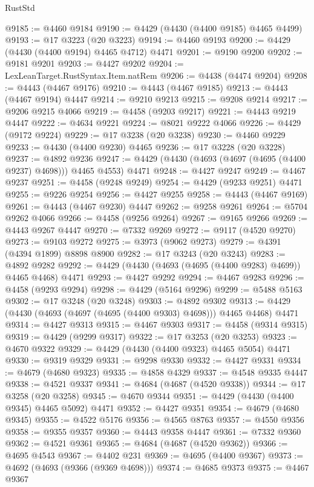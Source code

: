 \begin{lexlean}{RustStd}
\begin{coremodule}
{\begin{coremodule}
{{{{{{{{{{{{{{{{{{{{{{{{{{{{{{{{{{{{{{{{{{{{{{{{{{{{{{{{{{{{{{{{{{{{@9185 := @4460 @9184
@9190 := @4429 (@4430 (@4400 @9185) @4465 @4499)
@9193 := @17 @3223 (@20 @3223)
@9194 := @4460 @9193
@9200 := @4429 (@4430 (@4400 @9194) @4465 @4712) @4471
@9201 := @9190 @9200
@9202 := @9181 @9201
@9203 := @4427 @9202
@9204 := LexLeanTarget.RustSyntax.Item.natRem
@9206 := @4438 (@4474 @9204)
@9208 := @4443 (@4467 @9176)
@9210 := @4443 (@4467 @9185)
@9213 := @4443 (@4467 @9194) @4447
@9214 := @9210 @9213
@9215 := @9208 @9214
@9217 := @9206 @9215 @4066
@9219 := @4458 (@9203 @9217)
@9221 := @4443 @9219 @4447
@9222 := @4634 @9221
@9224 := @8021 @9222 @4066
@9226 := @4429 (@9172 @9224)
@9229 := @17 @3238 (@20 @3238)
@9230 := @4460 @9229
@9233 := @4430 (@4400 @9230) @4465
@9236 := @17 @3228 (@20 @3228)
@9237 := @4892 @9236
@9247 := @4429 (@4430 (@4693 (@4697 (@4695 (@4400 @9237) @4698))) @4465 @4553) @4471
@9248 := @4427 @9247
@9249 := @4467 @9237
@9251 := @4458 (@9248 @9249)
@9254 := @4429 (@9233 @9251) @4471
@9255 := @9226 @9254
@9256 := @4427 @9255
@9258 := @4443 (@4467 @9169)
@9261 := @4443 (@4467 @9230) @4447
@9262 := @9258 @9261
@9264 := @5704 @9262 @4066
@9266 := @4458 (@9256 @9264)
@9267 := @9165 @9266
@9269 := @4443 @9267 @4447
@9270 := @7332 @9269
@9272 := @9117 (@4520 @9270)
@9273 := @9103 @9272
@9275 := @3973 (@9062 @9273)
@9279 := @4391 (@4394 @1899) @8898 @8900
@9282 := @17 @3243 (@20 @3243)
@9283 := @4892 @9282
@9292 := @4429 (@4430 (@4693 (@4695 (@4400 @9283) @4699)) @4465 @4468) @4471
@9293 := @4427 @9292
@9294 := @4467 @9283
@9296 := @4458 (@9293 @9294)
@9298 := @4429 (@5164 @9296)
@9299 := @5488 @5163
@9302 := @17 @3248 (@20 @3248)
@9303 := @4892 @9302
@9313 := @4429 (@4430 (@4693 (@4697 (@4695 (@4400 @9303) @4698))) @4465 @4468) @4471
@9314 := @4427 @9313
@9315 := @4467 @9303
@9317 := @4458 (@9314 @9315)
@9319 := @4429 (@9299 @9317)
@9322 := @17 @3253 (@20 @3253)
@9323 := @4670 @9322
@9329 := @4429 (@4430 (@4400 @9323) @4465 @5054) @4471
@9330 := @9319 @9329
@9331 := @9298 @9330
@9332 := @4427 @9331
@9334 := @4679 (@4680 @9323)
@9335 := @4858 @4329
@9337 := @4548 @9335 @4447
@9338 := @4521 @9337
@9341 := @4684 (@4687 (@4520 @9338))
@9344 := @17 @3258 (@20 @3258)
@9345 := @4670 @9344
@9351 := @4429 (@4430 (@4400 @9345) @4465 @5092) @4471
@9352 := @4427 @9351
@9354 := @4679 (@4680 @9345)
@9355 := @4522 @5176
@9356 := @4565 @8763
@9357 := @4550 @9356
@9358 := @9355 @9357
@9360 := @4443 @9358 @4447
@9361 := @7332 @9360
@9362 := @4521 @9361
@9365 := @4684 (@4687 (@4520 @9362))
@9366 := @4695 @4543
@9367 := @4402 @231
@9369 := @4695 (@4400 @9367)
@9373 := @4692 (@4693 (@9366 (@9369 @4698)))
@9374 := @4685 @9373
@9375 := @4467 @9367
}}}}}}}}}}}}}}}}}}}}}}}}}}}}}}}}}}}}}}}}}}}}}}}}}}}}}}}}}}}}}}}}}}}}
\end{coremodule}}
\end{coremodule}
\end{lexlean}
